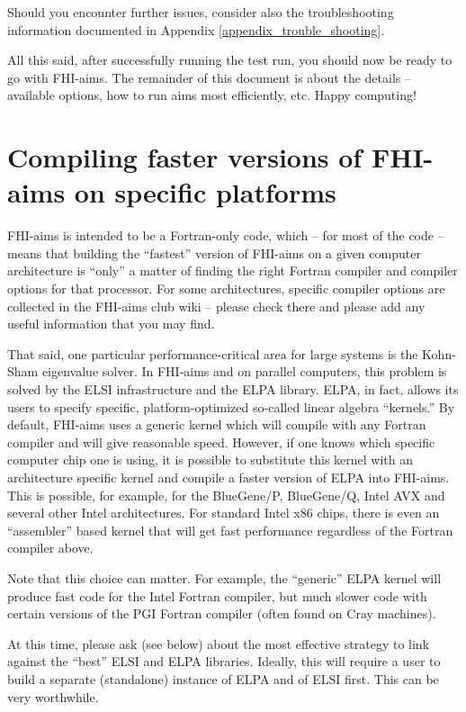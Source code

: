 Should you encounter further issues, consider also the troubleshooting
information documented in Appendix \ref{appendix_trouble_shooting}. 

All this said, after successfully running the test run, you should now be
ready to go with FHI-aims. The remainder of this document is about the details
-- available options, how to run aims most efficiently, etc. Happy computing!


\section{Compiling faster versions of FHI-aims on specific platforms}
\label{Sec:Platform}

FHI-aims is intended to be a Fortran-only code, which -- for most of
the code -- means that building the ``fastest'' version of FHI-aims on
a given computer architecture is ``only'' a matter of finding the
right Fortran compiler and compiler options for that processor. For
some architectures, specific compiler options are collected in the
FHI-aims club wiki -- please check there and please add any useful
information that you may find.

That said, one particular performance-critical area for large systems
is the Kohn-Sham eigenvalue solver. In FHI-aims and on parallel
computers, this problem is solved by the ELSI infrastructure and the
ELPA library. ELPA, in fact, 
allows its users to specify specific, platform-optimized so-called
linear algebra ``kernels.'' By default, FHI-aims uses a generic kernel
which will compile with any Fortran compiler and will give reasonable
speed. However, if one knows which specific computer chip one is
using, it is possible to substitute this kernel with an architecture
specific kernel and compile a faster version of ELPA into
FHI-aims. This is possible, for example, for the BlueGene/P,
BlueGene/Q, Intel AVX and several other Intel architectures. For
standard Intel x86 chips, there is even an ``assembler'' based kernel
that will get fast performance regardless of the Fortran compiler
above.

Note that this choice can matter. For example, the ``generic'' ELPA
kernel will produce fast code for the Intel Fortran compiler, but much
slower code with certain versions of the PGI Fortran compiler (often
found on Cray machines).

At this time, please ask (see below) about the most effective strategy
to link against the ``best'' ELSI and ELPA libraries. Ideally, this
will require a user to build a separate (standalone) instance of ELPA
and of ELSI first. This can be very worthwhile.

